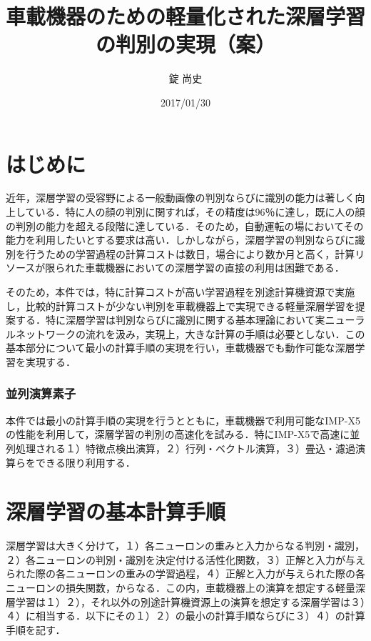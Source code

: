 \documentclass{jsarticle}
\title{車載機器のための軽量化された深層学習の判別の実現（案）}
\author{錠 尚史}
\date{2017/01/30}
\begin{document}
\maketitle


\part{はじめに}
\label{はじめに}

近年，深層学習の受容野による一般動画像の判別ならびに識別の能力は著しく向上している．特に人の顔の判別に関すれば，その精度は96％に達し，既に人の顔の判別の能力を超える段階に達している．そのため，自動運転の場においてその能力を利用したいとする要求は高い．しかしながら，深層学習の判別ならびに識別を行うための学習過程の計算コストは数日，場合により数か月と高く，計算リソースが限られた車載機器においての深層学習の直接の利用は困難である．

そのため，本件では，特に計算コストが高い学習過程を別途計算機資源で実施し，比較的計算コストが少ない判別を車載機器上で実現できる軽量深層学習を提案する．特に深層学習は判別ならびに識別に関する基本理論において実ニューラルネットワークの流れを汲み，実現上，大きな計算の手順は必要としない．この基本部分について最小の計算手順の実現を行い，車載機器でも動作可能な深層学習を実現する．

\section{並列演算素子}
\label{並列演算素子}

本件では最小の計算手順の実現を行うとともに，車載機器で利用可能なIMP-X5の性能を利用して，深層学習の判別の高速化を試みる．特にIMP-X5で高速に並列処理される１）特徴点検出演算，２）行列・ベクトル演算，３）畳込・濾過演算らをできる限り利用する．

\part{深層学習の基本計算手順}
\label{深層学習の基本計算手順}

深層学習は大きく分けて，１）各ニューロンの重みと入力からなる判別・識別，２）各ニューロンの判別・識別を決定付ける活性化関数，３）正解と入力が与えられた際の各ニューロンの重みの学習過程，４）正解と入力が与えられた際の各ニューロンの損失関数，からなる．この内，車載機器上の演算を想定する軽量深層学習は１）２），それ以外の別途計算機資源上の演算を想定する深層学習は３）４）に相当する．以下にその１）２）の最小の計算手順ならびに３）４）の計算手順を記す．
\end{document}
